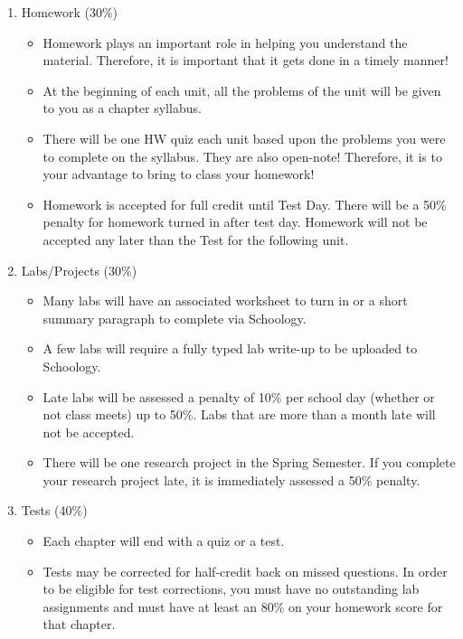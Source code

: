 \documentclass[10pt]{exam}
\begin{document}
\begin{enumerate}
	\item	Homework (30\%)
	\begin{itemize}
		\item 
			Homework plays an important role in helping you understand the material.  Therefore, it is important that it gets done in a timely manner! 
		\item 
			At the beginning of each unit, all the problems of the unit will be given to you as a chapter syllabus.  
		\item 
			There will be one HW quiz each unit based upon the problems you were to complete on the syllabus. They are also open-note!  Therefore, it is to your advantage to bring to class your homework!
		\item 
			Homework is accepted for full credit until Test Day.  There will be a 50\% penalty for homework turned in after test day.  Homework will not be accepted any later than the Test for the following unit.
	\end{itemize}
	\item	Labs/Projects (30\%)
	\begin{itemize}
		\item 
			Many labs will have an associated worksheet to turn in or a short summary paragraph to complete via Schoology.  
		\item 
			A few labs will require a fully typed lab write-up to be uploaded to Schoology.
		\item 
			Late labs will be assessed a penalty of 10\% per school day (whether or not class meets) up to 50\%.  Labs that are more than a month late will not be accepted.
		\item 
			There will be one research project in the Spring Semester.  If you complete your research project late, it is immediately assessed a 50\% penalty.
	\end{itemize}
	\item	Tests (40\%)
	\begin{itemize}
		\item	
			Each chapter will end with a quiz or a test.
		\item 
			Tests may be corrected for half-credit back on missed questions.  In order to be eligible for test corrections, you must have no outstanding lab assignments and must have at least an 80\% on your homework score for that chapter.
	\end{itemize}
	
\end{enumerate}
\end{document}
